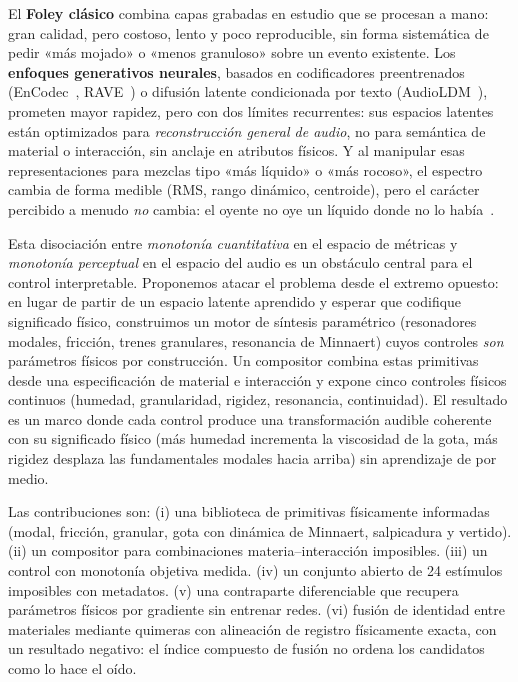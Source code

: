 \documentclass[a4paper,11pt,twoside]{article}
\begin{document}
El \textbf{Foley clásico} combina capas grabadas en estudio que se procesan a mano: gran calidad, pero costoso, lento y poco reproducible, sin forma sistemática de pedir «más mojado» o «menos granuloso» sobre un evento existente. Los \textbf{enfoques generativos neurales}, basados en codificadores preentrenados (EnCodec~\cite{defossez2022encodec}, RAVE~\cite{caillon2021rave}) o difusión latente condicionada por texto (AudioLDM~\cite{liu2023audioldm}), prometen mayor rapidez, pero con dos límites recurrentes: sus espacios latentes están optimizados para \emph{reconstrucción general de audio}, no para semántica de material o interacción, sin anclaje en atributos físicos. Y al manipular esas representaciones para mezclas tipo «más líquido» o «más rocoso», el espectro cambia de forma medible (RMS, rango dinámico, centroide), pero el carácter percibido a menudo \emph{no} cambia: el oyente no oye un líquido donde no lo había~\cite{devis2023control}.

Esta disociación entre \emph{monotonía cuantitativa} en el espacio de métricas y \emph{monotonía perceptual} en el espacio del audio es un obstáculo central para el control interpretable. Proponemos atacar el problema desde el extremo opuesto: en lugar de partir de un espacio latente aprendido y esperar que codifique significado físico, construimos un motor de síntesis paramétrico (resonadores modales, fricción, trenes granulares, resonancia de Minnaert) cuyos controles \emph{son} parámetros físicos por construcción. Un compositor combina estas primitivas desde una especificación de material e interacción y expone cinco controles físicos continuos (humedad, granularidad, rigidez, resonancia, continuidad). El resultado es un marco donde cada control produce una transformación audible coherente con su significado físico (más humedad incrementa la viscosidad de la gota, más rigidez desplaza las fundamentales modales hacia arriba) sin aprendizaje de por medio.

Las contribuciones son: (i) una biblioteca de primitivas físicamente informadas (modal, fricción, granular, gota con dinámica de Minnaert, salpicadura y vertido). (ii) un compositor para combinaciones materia--interacción imposibles. (iii) un control con monotonía objetiva medida. (iv) un conjunto abierto de 24 estímulos imposibles con metadatos. (v) una contraparte diferenciable que recupera parámetros físicos por gradiente sin entrenar redes. (vi) fusión de identidad entre materiales mediante quimeras con alineación de registro físicamente exacta, con un resultado negativo: el índice compuesto de fusión no ordena los candidatos como lo hace el oído.
\end{document}
